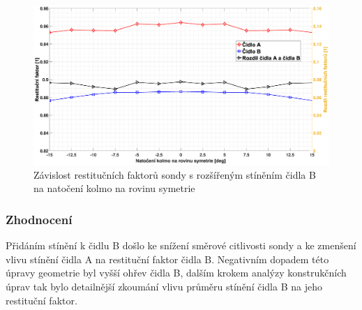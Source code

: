             \begin{figure}[ht!]
                \centering
                \includegraphics*[width=\textwidth, trim={5.9cm 1.0cm 2.7cm 2.0cm}]{400_SIMULACE_KONSTRUKCNICH_UPRAV/Grafy/03_kolma_rovina}
                \caption{Závislost restitučních faktorů sondy s rozšířeným stíněním čidla B na natočení kolmo na rovinu symetrie}
                \label{fig:sonda-s-rosirenym-stinenim-kolma-rovina}
            \end{figure}

        \subsubsection{Zhodnocení}
            Přidáním stínění k čidlu B došlo ke snížení směrové citlivosti sondy a ke zmenšení vlivu stínění čidla A na restituční faktor čidla B. Negativním dopadem této úpravy geometrie byl vyšší ohřev čidla B, dalším krokem analýzy konstrukčních úprav tak bylo detailnější zkoumání vlivu průměru stínění čidla B na jeho restituční faktor.
    
    \newpage
